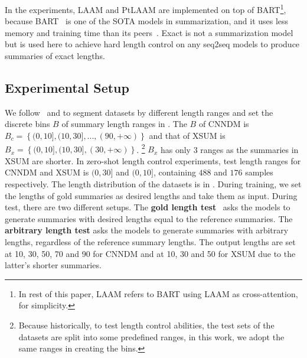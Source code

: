 In the experiments, LAAM and PtLAAM
are implemented on top of BART\footnote{In rest of this paper, LAAM refers 
to BART using LAAM as cross-attention, for simplicity.},
because BART~\cite{BART19} is one of the SOTA models in summarization,
and it uses less memory and training time than its peers~\cite{analysis20}.  
Exact is not a summarization model but is used here to achieve hard
length control on any seq2seq models to produce summaries of exact lengths.  

\subsection{Experimental Setup}
\label{sec:expset}
We follow~\citet{LiuLZ18} and \citet{Proto20}
to segment datasets by different length ranges
and set the discrete bins $B$ of summary length ranges in .
The $B$ of CNNDM is $B_{c}=\left\{(0,10],(10,30],...,(90,+\infty)\right\}$ and that of XSUM is $B_{x}=\left\{(0,10],(10,30],(30,+\infty)\right\}$.
\footnote{
Because historically, to test length control abilities,
the test sets of the datasets are split into some predefined ranges,
in this work, we adopt the same ranges in creating the bins.} 
$B_x$ has only 3 ranges as the summaries in XSUM are shorter.
In zero-shot length control experiments, 
test length ranges for CNNDM and XSUM is $(0,30]$ and $(0,10]$, 
containing $488$ and $176$ samples respectively. 
The length distribution of the datasets is in .
During training,
we set the lengths of gold summaries as desired lengths and take them as input.
During test, there are two different setups.
The {\bf gold length test}~\cite{Proto20} asks the models to
generate summaries with desired lengths equal to the reference summaries. 
The {\bf arbitrary length test} asks the models to generate summaries with
arbitrary lengths, regardless of the reference summary lengths. 
The output lengths are set at 10, 30, 50, 70 and 90 for CNNDM
and at 10, 30 and 50 for XSUM due to the latter's shorter summaries. 

